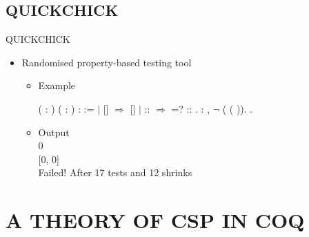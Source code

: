 \documentclass[t]{beamer}
\begin{document}
\subsection{QUICKCHICK}

\begin{frame}{QUICKCHICK}
	\begin{itemize}
		\item Randomised property-based testing tool
		\begin{itemize}
			\item Example\\
			\small
			\begin{coqdoccode}
				\coqdocnoindent
				  ( : ) ( :  ) :   :=\coqdoceol
				\coqdocindent{1.00em}
				  \coqdoceol
				\coqdocindent{2.00em}
				\ensuremath{|} []   \ensuremath{\Rightarrow} []\coqdoceol
				\coqdocindent{2.00em}
				\ensuremath{|} :: \ensuremath{\Rightarrow}   =?      ::   \coqdoceol
				\coqdocindent{1.00em}
				.\coqdoceol
				\coqdocemptyline
				\coqdocnoindent
				  : \coqdockw{\ensuremath{\forall}}  ,  \ensuremath{\lnot} (  (  )).\coqdoceol
				\coqdocemptyline
				\coqdocnoindent
				 .\coqdoceol
			\end{coqdoccode}

			\normalsize
			\item Output\\
			\ttfamily
			\small
			0\\
			{[0, 0]}\\
			Failed! After 17 tests and 12 shrinks
		\end{itemize}
	\end{itemize}
\end{frame}

\section{A THEORY OF CSP IN COQ}
\end{document}
